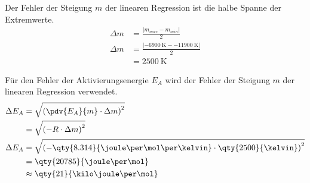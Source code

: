 Der Fehler der Steigung $m$ der linearen Regression ist die halbe Spanne der Extremwerte.
\begin{align*}
    \Delta m &= \frac{|m_{max} - m_{min}|}{2} \\
    \Delta m &= \frac{|\qty{-6900}{\kelvin} - \qty{-11900}{\kelvin}|}{2} \\
             &= \qty{2500}{\kelvin}
\end{align*}

Für den Fehler der Aktivierungsenergie $E_A$ wird der Fehler der Steigung $m$ der linearen Regression verwendet.
\begin{align*}
    \Delta E_A &= \sqrt{\left( \pdv{E_A}{m} \cdot \Delta m \right)^2} \\
               &= \sqrt{\left( -R \cdot \Delta m \right)^2} \\
    \Delta E_A &= \sqrt{\left( -\qty{8.314}{\joule\per\mol\per\kelvin} \cdot \qty{2500}{\kelvin} \right)^2} \\
               &= \qty{20785}{\joule\per\mol} \\
              &\approx \qty{21}{\kilo\joule\per\mol}
\end{align*}


